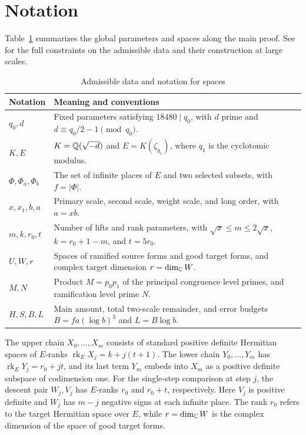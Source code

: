 \section*{Notation}

Table~\ref{tab:global-scales} summarizes the global parameters and spaces along the main proof. See  for the full constraints on the admissible data and their construction at large scales.

\begin{table}[htbp]
\centering
\caption{Admissible data and notation for spaces}
\label{tab:global-scales}
\small
\begin{tabular}{@{}>{\raggedright\arraybackslash}p{}
                  >{\raggedright\arraybackslash}p{}@{}}
\toprule
Notation & Meaning and conventions\\
\midrule
$q_0,d$ & Fixed parameters satisfying $18480\mid q_0$, with $d$ prime and $d\equiv q_0/2-1\pmod{q_0}$. \\
$K,E$ & $K=\mathbb{Q}(\sqrt{-d})$ and $E=K(\zeta_{q_1})$, where $q_1$ is the cyclotomic modulus. \\
$\Phi,\Phi_a,\Phi_b$ & The set of infinite places of $E$ and two selected subsets, with $f=|\Phi|$. \\
$x,x_1,b,a$ & Primary scale, second scale, weight scale, and long order, with $a=xb$. \\
$m,k,r_0,t$ & Number of lifts and rank parameters, with $\sqrt{x}\le m\le2\sqrt{x}$, $k=r_0+1-m$, and $t=5r_0$. \\
$U,W,r$ & Spaces of ramified source forms and good target forms, and complex target dimension $r=\dim_{\mathbb{C}}W$. \\
$M,N$ & Product $M=p_0p_1$ of the principal congruence level primes, and ramification level prime $N$. \\
$H,S,B,L$ & Main amount, total two-scale remainder, and error budgets $B=fa(\log b)^3$ and $L=B\log b$. \\
\bottomrule
\end{tabular}
\end{table}

The upper chain $X_0,\ldots,X_m$ consists of standard positive definite Hermitian spaces of $E$-ranks $\operatorname{rk}_E X_j=k+j(t+1)$. The lower chain $Y_0,\ldots,Y_m$ has $\operatorname{rk}_E Y_j=r_0+jt$, and its last term $Y_m$ embeds into $X_m$ as a positive definite subspace of codimension one. For the single-step comparison at step $j$, the descent pair $W_j,V_j$ has $E$-ranks $r_0$ and $r_0+t$, respectively. Here $V_j$ is positive definite and $W_j$ has $m-j$ negative signs at each infinite place. The rank $r_0$ refers to the target Hermitian space over $E$, while $r=\dim_{\mathbb{C}}W$ is the complex dimension of the space of good target forms.
